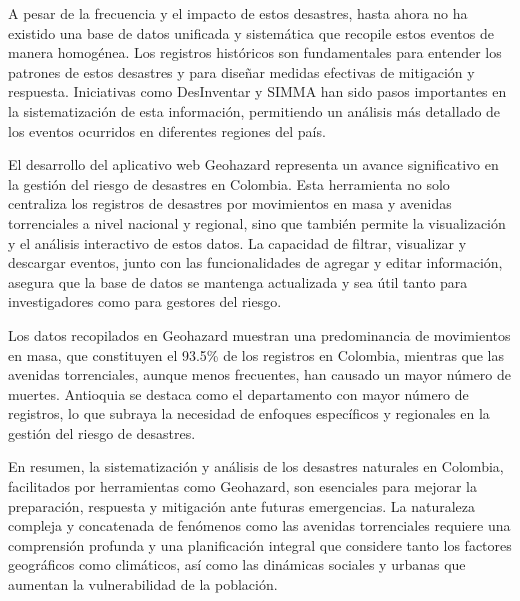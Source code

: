 \documentclass{article}
\begin{document}
A pesar de la frecuencia y el impacto de estos desastres, hasta ahora no ha existido una base de datos unificada y sistemática que recopile estos eventos de manera homogénea. Los registros históricos son fundamentales para entender los patrones de estos desastres y para diseñar medidas efectivas de mitigación y respuesta. Iniciativas como DesInventar y SIMMA han sido pasos importantes en la sistematización de esta información, permitiendo un análisis más detallado de los eventos ocurridos en diferentes regiones del país.

El desarrollo del aplicativo web Geohazard representa un avance significativo en la gestión del riesgo de desastres en Colombia. Esta herramienta no solo centraliza los registros de desastres por movimientos en masa y avenidas torrenciales a nivel nacional y regional, sino que también permite la visualización y el análisis interactivo de estos datos. La capacidad de filtrar, visualizar y descargar eventos, junto con las funcionalidades de agregar y editar información, asegura que la base de datos se mantenga actualizada y sea útil tanto para investigadores como para gestores del riesgo.

Los datos recopilados en Geohazard muestran una predominancia de movimientos en masa, que constituyen el 93.5\% de los registros en Colombia, mientras que las avenidas torrenciales, aunque menos frecuentes, han causado un mayor número de muertes. Antioquia se destaca como el departamento con mayor número de registros, lo que subraya la necesidad de enfoques específicos y regionales en la gestión del riesgo de desastres.

En resumen, la sistematización y análisis de los desastres naturales en Colombia, facilitados por herramientas como Geohazard, son esenciales para mejorar la preparación, respuesta y mitigación ante futuras emergencias. La naturaleza compleja y concatenada de fenómenos como las avenidas torrenciales requiere una comprensión profunda y una planificación integral que considere tanto los factores geográficos como climáticos, así como las dinámicas sociales y urbanas que aumentan la vulnerabilidad de la población.



\end{document}
